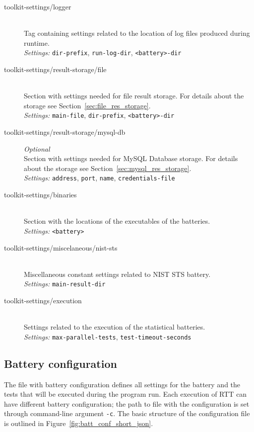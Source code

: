 \documentclass[
  digital,  	%
  color,		%
  oneside,   	%
  12pt,
  nocover,
  notable,
  nolof,
  nolot,
]{fithesis3}
\theoremstyle{definition}
\theoremstyle{remark}
\begin{document}
\begin{description}
\item[toolkit-settings/logger] \hfill \\
Tag containing settings related to the location of log files produced during runtime. \\
\textit{Settings: } \texttt{dir-prefix}, \texttt{run-log-dir}, \texttt{<battery>-dir}

\item[toolkit-settings/result-storage/file] \hfill \\
Section with settings needed for file result storage. For details about the storage see Section~\ref{sec:file_res_storage}. \\
\textit{Settings: } \texttt{main-file}, \texttt{dir-prefix}, \texttt{<battery>-dir}

\item[toolkit-settings/result-storage/mysql-db] \textit{Optional} \hfill \\
Section with settings needed for MySQL Database storage. For details about the storage see Section~\ref{sec:mysql_res_storage}. \\
\textit{Settings: } \texttt{address}, \texttt{port}, \texttt{name}, \texttt{credentials-file}

\item[toolkit-settings/binaries] \hfill \\
Section with the locations of the executables of the batteries. \\
\textit{Settings: } \texttt{<battery>}

\item[toolkit-settings/miscelaneous/nist-sts] \hfill \\
Miscellaneous constant settings related to NIST STS battery. \\
\textit{Settings: } \texttt{main-result-dir}

\item[toolkit-settings/execution] \hfill \\
Settings related to the execution of the statistical batteries. \\
\textit{Settings: } \texttt{max-parallel-tests}, \texttt{test-timeout-seconds}

\end{description}

\subsection{Battery configuration}
\label{sec:batt_conf}
The file with battery configuration defines all settings for the battery and the tests that will be executed during the program run. Each execution of RTT can have different battery configuration; the path to file with the configuration is set through command-line argument \texttt{-c}. The basic structure of the configuration file is outlined in Figure~\ref{fig:batt_conf_short_json}. 
\end{document}
